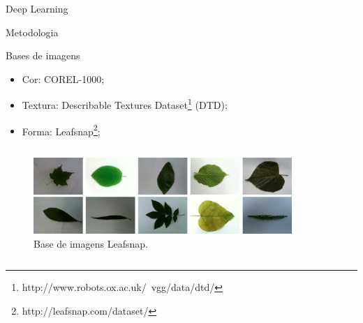 \documentclass{beamer}
\begin{document}
\begin{frame}{Deep Learning}
\begin{frame}{Metodologia}
 
 \begin{figure}[hbpt]
 \begin{center}
   \texttt{[image: \\detokenize \{figuras/exemplos\_corel.png]}}
 \end{center}
  \caption{Base de imagens COREL-1000}
\end{figure}
\end{frame}
\begin{frame}{Metodologia}
\begin{block}{Bases de imagens}
\justifying
\begin{itemize}
\item Cor: COREL-1000;
\item Textura: Describable Textures Dataset\footnote{http://www.robots.ox.ac.uk/~vgg/data/dtd/} (DTD);
\item Forma: Leafsnap\footnote{http://leafsnap.com/dataset/};
\end{itemize}
\end{block}
\vspace{1em}
\begin{columns}
  \begin{column}{0.5\textwidth}
    \begin{figure}[hbpt]
      \begin{center}
        \includegraphics[width=\columnwidth]{figuras/leafs.png}
      \end{center}
      \caption{Base de imagens Leafsnap.}
    \end{figure}
    \end{column}
  \begin{column}{0.5\textwidth}
    \begin{figure}[hbpt]

\end{figure}
\end{column}
\end{columns}
\end{frame}
\end{frame}
\end{document}
